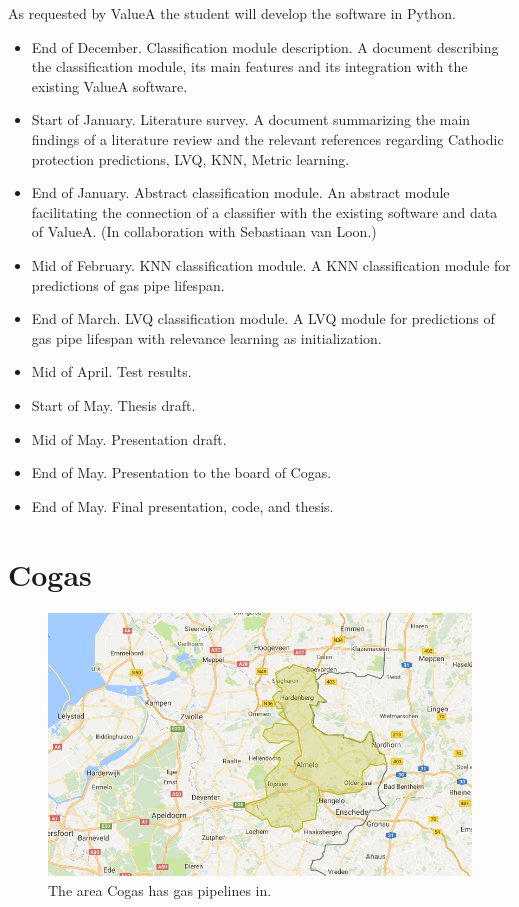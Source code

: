 As requested by ValueA the student will develop the software in Python.
\begin{itemize}
\item End of December. Classification module description. A document describing the classification module, its main features and its integration with the existing ValueA software.
\item Start of January. Literature survey. A document summarizing the main findings of a literature review and the relevant references regarding Cathodic protection predictions, LVQ, KNN, Metric learning.
\item End of January. Abstract classification module. An abstract module facilitating the connection of a classifier with the existing software and data of ValueA. (In collaboration with Sebastiaan van Loon.)
\item Mid of February. KNN classification module. A KNN classification module for predictions of gas pipe lifespan.
\item End of March. LVQ classification module. A LVQ module for predictions of gas pipe lifespan with relevance learning as initialization.
\item Mid of April. Test results.
\item Start of May. Thesis draft.
\item Mid of May. Presentation draft.
\item End of May. Presentation to the board of Cogas.
\item End of May. Final presentation, code, and thesis.
\end{itemize}

\section{Cogas}

\begin{figure}[!htb]
\centering
\includegraphics[width=.75\textwidth]{./figures/introduction/cogas_area.png}
\caption{The area Cogas has gas pipelines in.}
\label{fig:intro:cogas-area}
\end{figure}


